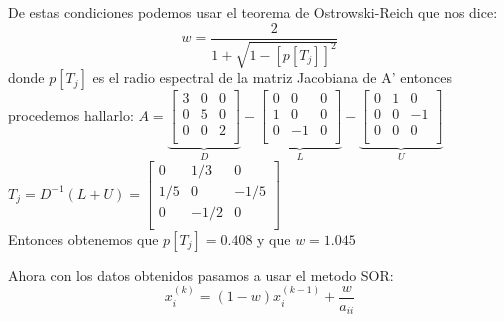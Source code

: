 \begin{frame}
    \begin{solution}
       De estas condiciones podemos usar el teorema de Ostrowski-Reich que nos dice:
        \begin{equation*}
            w=\frac{2}{1+\sqrt{1-[p[T_{j}]]^{2}}}
        \end{equation*}
        donde \begin{math}
            p[T_{j}]
        \end{math}
        es el radio espectral de la matriz Jacobiana de A'
    entonces procedemos hallarlo:
        \begin{math}
          A=  
        \underbrace{ \begin{bmatrix}
        3 & 0 & 0 \\
        0 & 5 & 0 \\
        0 & 0 & 2 \\
        \end{bmatrix}}_{\displaystyle D}
        -
        \underbrace{\begin{bmatrix}
        0 & 0 & 0 \\
        1 & 0 & 0 \\
        0 & -1 & 0 \\
        \end{bmatrix}}_{\displaystyle L}
        -
        \underbrace{\begin{bmatrix}
        0 & 1 & 0 \\
        0 & 0 & -1 \\
        0 & 0 & 0 \\
        \end{bmatrix}}_{\displaystyle U}
        
        \end{math} 
        \begin{math}
            T_{j}=D^{-1}(L+U)
        =\begin{bmatrix}
            0 & 1/3 & 0 \\
            1/5 & 0 & -1/5 \\
            0 & -1/2 & 0 \\
            \end{bmatrix}
        \end{math}
        \\Entonces obtenemos que
        \begin{math}
            p[T_{j}]=0.408
        \end{math} 
        y que 
        \begin{math}
            w=1.045
        \end{math}
        
    \end{solution}
\end{frame}

\begin{frame}

    \begin{solution}
      Ahora con los datos obtenidos pasamos a usar el metodo SOR:
      \begin{equation}
          x_{i}^(k)=(1-w) x_{i}^(k-1)+\frac{w}{a_{ii}}
      \end{equation}
    \end{solution}
    
\end{frame}